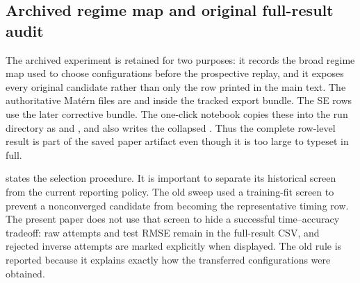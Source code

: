 \subsection{Archived regime map and original full-result audit}
\label{app:archived-regime-map}

\begin{sloppypar}
The archived experiment is retained for two purposes: it records the broad
regime map used to choose configurations before the prospective replay, and
it exposes every original candidate rather than only the row printed in the
main text.  The authoritative Mat\'ern files are
 and
 inside the tracked
 export bundle.  The SE
rows use the later corrective
 bundle.  The one-click notebook copies
these into the run directory as
 and
, and also writes the collapsed
.  Thus the complete row-level result
is part of the saved paper artifact even though it is too large to typeset in
full.

 states the selection procedure.  It
is important to separate its historical screen from the current reporting
policy.  The old sweep used a training-fit screen to prevent a nonconverged
candidate from becoming the representative timing row.  The present paper
does not use that screen to hide a successful time--accuracy tradeoff: raw
attempts and test RMSE remain in the full-result CSV, and rejected inverse
attempts are marked explicitly when displayed.  The old rule is reported
because it explains exactly how the transferred configurations were obtained.
\end{sloppypar}

